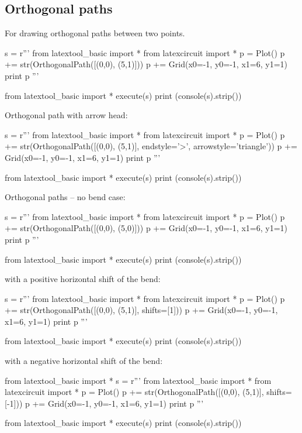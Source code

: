 \newpage
\subsection{Orthogonal paths}
For drawing orthogonal paths between two points.
\begin{python}
s = r'''
from latextool_basic import *
from latexcircuit import *
p = Plot()
p += str(OrthogonalPath([(0,0), (5,1)]))
p += Grid(x0=-1, y0=-1, x1=6, y1=1)
print p
'''

from latextool_basic import *
execute(s)
print (console(s).strip())
\end{python}


Orthogonal path with arrow head:
\begin{python}
s = r'''
from latextool_basic import *
from latexcircuit import *
p = Plot()
p += str(OrthogonalPath([(0,0), (5,1)], endstyle='>', arrowstyle='triangle'))
p += Grid(x0=-1, y0=-1, x1=6, y1=1)
print p
'''

from latextool_basic import *
execute(s)
print (console(s).strip())
\end{python}



\newpage
Orthogonal paths -- no bend case:
\begin{python}
s = r'''
from latextool_basic import *
from latexcircuit import *
p = Plot()
p += str(OrthogonalPath([(0,0), (5,0)]))
p += Grid(x0=-1, y0=-1, x1=6, y1=1)
print p
'''

from latextool_basic import *
execute(s)
print (console(s).strip())
\end{python}


\newpage
with a positive horizontal shift of the bend:
\begin{python}
s = r'''
from latextool_basic import *
from latexcircuit import *
p = Plot()
p += str(OrthogonalPath([(0,0), (5,1)], shifts=[1]))
p += Grid(x0=-1, y0=-1, x1=6, y1=1)
print p
'''

from latextool_basic import *
execute(s)
print (console(s).strip())
\end{python}


with a negative horizontal shift of the bend:
\begin{python}
from latextool_basic import *
s = r'''
from latextool_basic import *
from latexcircuit import *
p = Plot()
p += str(OrthogonalPath([(0,0), (5,1)], shifts=[-1]))
p += Grid(x0=-1, y0=-1, x1=6, y1=1)
print p
'''

from latextool_basic import *
execute(s)
print (console(s).strip())
\end{python}

